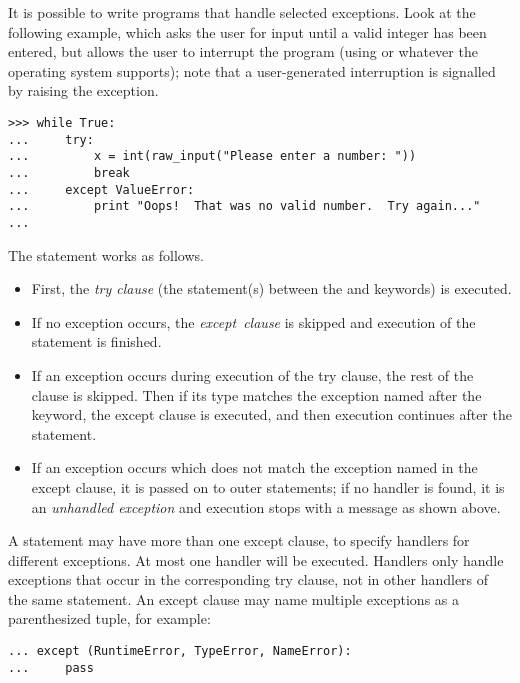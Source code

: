 \documentclass{manual}
\begin{document}
It is possible to write programs that handle selected exceptions.
Look at the following example, which asks the user for input until a
valid integer has been entered, but allows the user to interrupt the
program (using  or whatever the operating system
supports); note that a user-generated interruption is signalled by
raising the  exception.

\begin{verbatim}
>>> while True:
...     try:
...         x = int(raw_input("Please enter a number: "))
...         break
...     except ValueError:
...         print "Oops!  That was no valid number.  Try again..."
...     
\end{verbatim}

The  statement works as follows.

\begin{itemize}
\item
First, the \emph{try clause} (the statement(s) between the
 and  keywords) is executed.

\item
If no exception occurs, the \emph{except\ clause} is skipped and
execution of the  statement is finished.

\item
If an exception occurs during execution of the try clause, the rest of
the clause is skipped.  Then if its type matches the exception named
after the  keyword, the except clause is executed, and
then execution continues after the  statement.

\item
If an exception occurs which does not match the exception named in the
except clause, it is passed on to outer  statements; if
no handler is found, it is an \emph{unhandled exception} and execution
stops with a message as shown above.

\end{itemize}

A  statement may have more than one except clause, to
specify handlers for different exceptions.  At most one handler will
be executed.  Handlers only handle exceptions that occur in the
corresponding try clause, not in other handlers of the same
 statement.  An except clause may name multiple exceptions
as a parenthesized tuple, for example:

\begin{verbatim}
... except (RuntimeError, TypeError, NameError):
...     pass
\end{verbatim}
\end{document}
